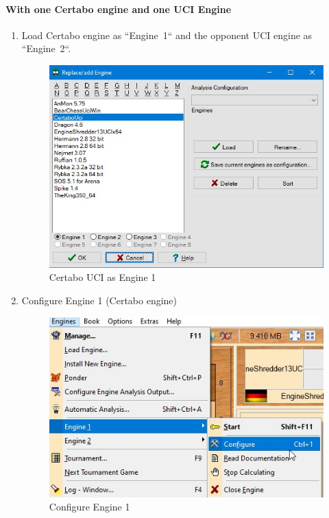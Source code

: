 \documentclass[11pt,a4paper]{article}
\begin{document}
\paragraph{With one Certabo engine and one UCI Engine}
\begin{enumerate}
\item Load Certabo engine as \mbox{``Engine 1``} and the opponent UCI engine as \mbox{``Engine 2``}.
	\begin{figure}[H]
	\centering
	\includegraphics[scale=0.6]{arena_engine1.jpg}
	\caption{Certabo UCI as Engine 1}
	\label{fig:ArenaEngine1}
\end{figure}
\item Configure Engine 1 (Certabo engine)
\begin{figure}[H]
	\centering
	\includegraphics[scale=0.6]{arena_configureengine1.jpg}
	\caption{Configure Engine 1}
	\label{fig:ArenaConfigureEngine1}

\end{figure}
\end{enumerate}
\end{document}
